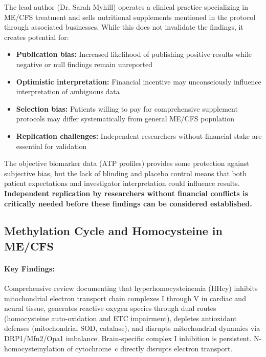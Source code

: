 The lead author (Dr. Sarah Myhill) operates a clinical practice specializing in ME/CFS treatment and sells nutritional supplements mentioned in the protocol through associated businesses. While this does not invalidate the findings, it creates potential for:
\begin{itemize}
    \item \textbf{Publication bias:} Increased likelihood of publishing positive results while negative or null findings remain unreported
    \item \textbf{Optimistic interpretation:} Financial incentive may unconsciously influence interpretation of ambiguous data
    \item \textbf{Selection bias:} Patients willing to pay for comprehensive supplement protocols may differ systematically from general ME/CFS population
    \item \textbf{Replication challenges:} Independent researchers without financial stake are essential for validation
\end{itemize}

The objective biomarker data (ATP profiles) provides some protection against subjective bias, but the lack of blinding and placebo control means that both patient expectations and investigator interpretation could influence results. \textbf{Independent replication by researchers without financial conflicts is critically needed before these findings can be considered established.}

\subsection{Methylation Cycle and Homocysteine in ME/CFS}


\paragraph{Key Findings:}
Comprehensive review documenting that hyperhomocysteinemia (HHcy) inhibits mitochondrial electron
transport chain complexes I through V in cardiac and neural tissue, generates reactive oxygen species
through dual routes (homocysteine auto-oxidation and ETC impairment), depletes antioxidant defenses
(mitochondrial SOD, catalase), and disrupts mitochondrial dynamics via DRP1/Mfn2/Opa1 imbalance.
Brain-specific complex I inhibition is persistent. N-homocysteinylation of cytochrome~c directly
disrupts electron transport.

